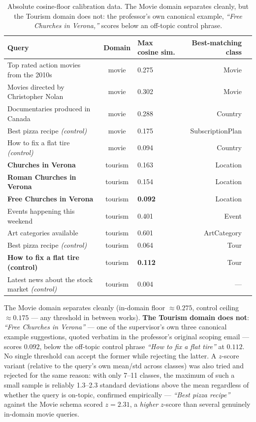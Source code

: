 \documentclass[11pt,a4paper]{article}
\begin{document}
\begin{table}[H]
\centering
\begin{tabular}{lclr l}
\toprule
\textbf{Query} & \textbf{Domain} & \textbf{Max cosine sim.} & \textbf{Best-matching class} \\
\midrule
Top rated action movies from the 2010s        & movie    & 0.275 & Movie \\
Movies directed by Christopher Nolan          & movie    & 0.302 & Movie \\
Documentaries produced in Canada              & movie    & 0.288 & Country \\
Best pizza recipe \emph{(control)}            & movie    & 0.175 & SubscriptionPlan \\
How to fix a flat tire \emph{(control)}       & movie    & 0.094 & Country \\
\textbf{Churches in Verona}                   & tourism  & 0.163 & Location \\
\textbf{Roman Churches in Verona}             & tourism  & 0.154 & Location \\
\textbf{Free Churches in Verona}              & tourism  & \textbf{0.092} & Location \\
Events happening this weekend                 & tourism  & 0.401 & Event \\
Art categories available                      & tourism  & 0.601 & ArtCategory \\
Best pizza recipe \emph{(control)}            & tourism  & 0.064 & Tour \\
\textbf{How to fix a flat tire (control)}     & tourism  & \textbf{0.112} & Tour \\
Latest news about the stock market \emph{(control)} & tourism & 0.004 & --- \\
\bottomrule
\end{tabular}
\caption{Absolute cosine-floor calibration data. The Movie domain separates cleanly, but the
Tourism domain does not: the professor's own canonical example, \emph{``Free Churches in
Verona,''} scores below an off-topic control phrase.}
\label{tab:calibration}
\end{table}

The Movie domain separates cleanly (in-domain floor $\approx 0.275$, control ceiling
$\approx 0.175$ --- any threshold in between works). \textbf{The Tourism domain does not}:
\emph{``Free Churches in Verona''} --- one of the supervisor's own three canonical example
suggestions, quoted verbatim in the professor's original scoping email --- scores $0.092$, below
the off-topic control phrase \emph{``How to fix a flat tire''} at $0.112$. No single threshold can
accept the former while rejecting the latter. A $z$-score variant (relative to the query's own
mean/std across classes) was also tried and rejected for the same reason: with only 7--11 classes,
the maximum of such a small sample is reliably 1.3--2.3 standard deviations above the mean
regardless of whether the query is on-topic, confirmed empirically --- \emph{``Best pizza
recipe''} against the Movie schema scored $z = 2.31$, a \emph{higher} $z$-score than several
genuinely in-domain movie queries.
\end{document}
